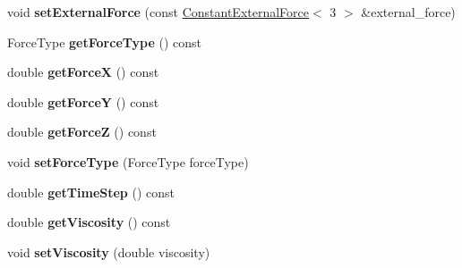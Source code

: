 \begin{DoxyCompactItemize}
\item 
\hypertarget{classnatrium_1_1CollisionModel_ae899a80c7dcfbbdb68dd6b4e4fff5a49}{
void {\bfseries setExternalForce} (const \hyperlink{classnatrium_1_1ConstantExternalForce}{ConstantExternalForce}$<$ 3 $>$ \&external\_\-force)}
\label{classnatrium_1_1CollisionModel_ae899a80c7dcfbbdb68dd6b4e4fff5a49}

\item 
\hypertarget{classnatrium_1_1CollisionModel_a6806e1494a2bbb03c27b146261af408b}{
ForceType {\bfseries getForceType} () const }
\label{classnatrium_1_1CollisionModel_a6806e1494a2bbb03c27b146261af408b}

\item 
\hypertarget{classnatrium_1_1CollisionModel_a366ae27de1bf045fd9bf0159e251054a}{
double {\bfseries getForceX} () const }
\label{classnatrium_1_1CollisionModel_a366ae27de1bf045fd9bf0159e251054a}

\item 
\hypertarget{classnatrium_1_1CollisionModel_a1282b42d5c270b9f031def96dbe15866}{
double {\bfseries getForceY} () const }
\label{classnatrium_1_1CollisionModel_a1282b42d5c270b9f031def96dbe15866}

\item 
\hypertarget{classnatrium_1_1CollisionModel_a60fa9f8c1614789027c553264524fb5e}{
double {\bfseries getForceZ} () const }
\label{classnatrium_1_1CollisionModel_a60fa9f8c1614789027c553264524fb5e}

\item 
\hypertarget{classnatrium_1_1CollisionModel_acff518f0353a95dfbf3ddeba2a7ed7f6}{
void {\bfseries setForceType} (ForceType forceType)}
\label{classnatrium_1_1CollisionModel_acff518f0353a95dfbf3ddeba2a7ed7f6}

\item 
\hypertarget{classnatrium_1_1CollisionModel_aa2a154a99039deb620501ef2e525089f}{
double {\bfseries getTimeStep} () const }
\label{classnatrium_1_1CollisionModel_aa2a154a99039deb620501ef2e525089f}

\item 
\hypertarget{classnatrium_1_1CollisionModel_a4ee445caf75fff704811e29fc46f431e}{
double {\bfseries getViscosity} () const }
\label{classnatrium_1_1CollisionModel_a4ee445caf75fff704811e29fc46f431e}

\item 
\hypertarget{classnatrium_1_1CollisionModel_a43cfd1efe035afb6f170b7b05c18113a}{
void {\bfseries setViscosity} (double viscosity)}
\label{classnatrium_1_1CollisionModel_a43cfd1efe035afb6f170b7b05c18113a}

\end{DoxyCompactItemize}


